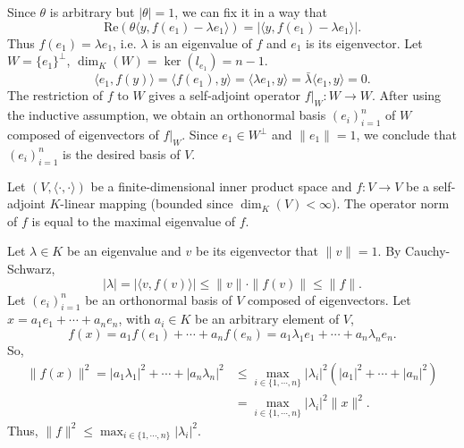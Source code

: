 \begin{proofenv}
    Since $\theta$ is arbitrary but $|\theta|=1$, we can fix it in a way that
    $$\mathrm{Re}\left(\theta\langle y, f(e_1) - \lambda e_1\rangle\right) = | \langle y, f(e_1) - \lambda e_1\rangle|.$$
    Thus $f(e_1) = \lambda e_1$, i.e. $\lambda$ is an eigenvalue of $f$ and $e_1$ is its eigenvector.
    Let $W = \{e_1\}^{\perp}$, $\dim_{K}(W) = \ker(l_{e_1}) = n - 1$.
    $$ \langle e_1, f(y) \rangle = \langle f(e_1) ,y\rangle = \langle \lambda e_1 ,y \rangle = \bar{\lambda} \langle e_1, y\rangle = 0.$$
    The restriction of $f$ to $W$ gives a self-adjoint operator $f|_{W} : W\rightarrow W$.
    After using the inductive assumption, we obtain an orthonormal basis $\left(e_i\right)_{i=1}^{n}$ of $W$ composed of eigenvectors of $f|_{W}$.
    Since $e_1\in W^\perp$ and $\|e_1\| =1$, we conclude that $\left(e_i\right)_{i=1}^{n}$ is the desired basis of $V$.
\end{proofenv}

\begin{corollaryenv}
    Let $(V,\langle\cdot,\cdot\rangle)$ be a finite-dimensional inner product space and $f:V\rightarrow V$ be a self-adjoint $K$-linear mapping (bounded since $\dim_{K}(V) < \infty$).
    The operator norm of $f$ is equal to the maximal eigenvalue of $f$.
\end{corollaryenv}
\begin{proofenv}
    Let $\lambda \in K$ be an eigenvalue and $v$ be its eigenvector that $\|v\| = 1$.
    By Cauchy-Schwarz,
    $$ |\lambda| = |\langle v,f(v)\rangle| \le \| v\| \cdot\|f(v)\| \le \|f\|.$$
    Let $(e_i)_{i=1}^{n}$ be an orthonormal basis of $V$ composed of eigenvectors.
    Let $x = a_1 e_1 + \cdots + a_n e_n$, with $a_i \in K$ be an arbitrary element of $V$,
    $$ f(x) = a_1 f(e_1) + \cdots + a_n f(e_n) = a_1 \lambda_1 e_1 + \cdots + a_n \lambda_n e_n.$$
    So, 
    $$\begin{aligned}
        \|f(x)\|^2 = |a_1 \lambda_1|^2 + \cdots + |a_n \lambda_n|^2 &\le \max_{i\in \{1,\cdots,n\}} |\lambda_i|^2 \left(|a_1|^2 + \cdots + |a_n|^2\right)\\
        &= \max_{i\in \{1,\cdots,n\}} |\lambda_i|^2 \|x\|^2.
    \end{aligned}$$
    Thus, $\|f\|^2 \le \max_{i\in \{1,\cdots,n\}} |\lambda_i|^2.$
\end{proofenv}


